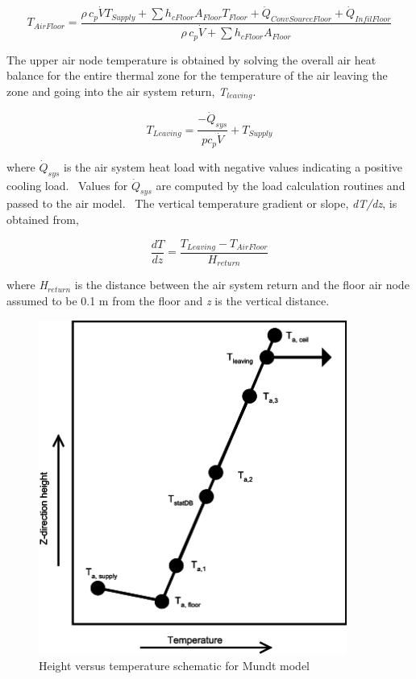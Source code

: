 {\begin{equation}
{T_{AirFloor}} = \frac{{\rho \,{c_p}\dot V{T_{Supply}} + \sum {{h_{cFloor}}{A_{Floor}}{T_{Floor}}}  + {{\dot Q}_{ConvSourceFloor}} + {{\dot Q}_{InfilFloor}}}}{{\rho \,{c_p}\dot V + \sum {{h_{cFloor}}{A_{Floor}}} }}
\end{equation}

The upper air node temperature is obtained by solving the overall air heat balance for the entire thermal zone for the temperature of the air leaving the zone and going into the air system return, \emph{T\(_{leaving}\)}.

\begin{equation}
{T_{Leaving}} = \frac{{ - {{\dot Q}_{sys}}}}{{p{c_p}\dot V}} + {T_{Supply}}
\end{equation}

where \({\dot Q_{sys}}\) is the air system heat load with negative values indicating a positive cooling load.~ Values for \({\dot Q_{sys}}\) are computed by the load calculation routines and passed to the air model.~ The vertical temperature gradient or slope, \emph{dT/dz}, is obtained from,

\begin{equation}
\frac{{dT}}{{dz}} = \frac{{{T_{Leaving}} - {T_{AirFloor}}}}{{{H_{return}}}}
\end{equation}

where \emph{H\(_{return}\)} is the distance between the air system return and the floor air node assumed to be 0.1 m from the floor and \emph{z} is the vertical distance.

\begin{figure}[hbtp] %
\centering
\includegraphics[width=0.9\textwidth, height=0.9\textheight, keepaspectratio=true]{media/image2341.svg.png}
\caption{Height versus temperature schematic for Mundt model \protect \label{fig:height-versus-temperature-schematic-for-mundt}}
\end{figure}

}
